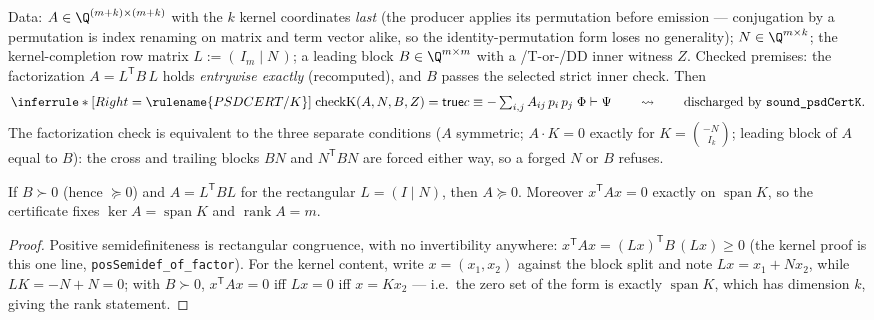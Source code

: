

\begin{brecipe}\label{rec:psdk-instance}
Data: $A \in \Q^{(m+k)\times(m+k)}$ with the $k$ kernel coordinates
\emph{last} (the producer applies its permutation before emission ---
conjugation by a permutation is index renaming on matrix and term
vector alike, so the identity-permutation form loses no generality);
$N \in \Q^{m \times k}$; the kernel-completion row matrix
$L := (\,I_m \mid N\,)$; a leading block $B \in \Q^{m\times m}$ with a
/T-or-/DD inner witness $Z$. Checked premises: the factorization
$A = L^{\mathsf T} B\, L$ holds \emph{entrywise exactly} (recomputed),
and $B$ passes the selected strict inner check. Then
\[
\inferrule*[Right=\rulename{PSDCERT/K}]
  {\;\mathrm{checkK}(A, N, B, Z) = \mathsf{true} \\
    c \equiv -\textstyle\sum_{i,j} A_{ij}\,p_i\,p_j\;}
  {\Phi \vdash \Psi}
\qquad\rightsquigarrow\qquad
\text{\upshape discharged by } \texttt{sound\_psdCertK}.
\]
The factorization check is equivalent to the three separate conditions
($A$ symmetric; $A \cdot K = 0$ exactly for
$K = \binom{-N}{\,I_k}$; leading block of $A$ equal to $B$): the
cross and trailing blocks $BN$ and $N^{\mathsf T} B N$ are forced
either way, so a forged $N$ or $B$ refuses.
\end{brecipe}

\begin{bprop}\label{prop:psdk-matrix}
If $B \succ 0$ (hence $\succcurlyeq 0$) and
$A = L^{\mathsf T} B L$ for the rectangular $L = (I \mid N)$, then
$A \succcurlyeq 0$. Moreover $x^{\mathsf T} A x = 0$ exactly on
$\operatorname{span} K$, so the certificate fixes
$\ker A = \operatorname{span} K$ and
$\operatorname{rank} A = m$.
\end{bprop}
\begin{proof}
Positive semidefiniteness is rectangular congruence, with no
invertibility anywhere: $x^{\mathsf T} A x = (Lx)^{\mathsf T} B\,(Lx)
\geq 0$ (the kernel proof is this one line,
\texttt{posSemidef\_of\_factor}). For the kernel content, write
$x = (x_1, x_2)$ against the block split and note
$Lx = x_1 + N x_2$, while $L K = -N + N = 0$; with $B \succ 0$,
$x^{\mathsf T} A x = 0$ iff $Lx = 0$ iff $x = K x_2$ --- i.e.\ the
zero set of the form is exactly $\operatorname{span} K$, which has
dimension $k$, giving the rank statement.
\end{proof}

